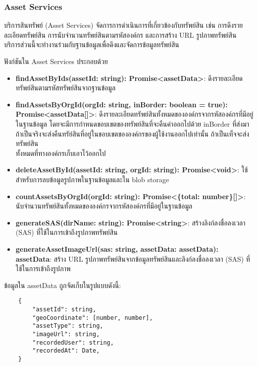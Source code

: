 \subsubsection{Asset Services}
\ifenglish
\else
บริการสินทรัพย์ (Asset Services) จัดการการดำเนินการที่เกี่ยวข้องกับทรัพย์สิน เช่น การดึงรายละเอียดทรัพย์สิน การนับจำนวนทรัพย์สินตามรหัสองค์กร และการสร้าง URL รูปภาพทรัพย์สิน บริการส่วนนี้จะทำงานร่วมกับฐานข้อมูลเพื่อดึงและจัดการข้อมูลทรัพย์สิน

ฟังก์ชันใน Asset Services ประกอบด้วย

\begin{itemize}
    \item \textbf{findAssetByIds(assetId: string): Promise<assetData>}: ดึงรายละเอียดทรัพย์สินตามรหัสทรัพย์สินจากฐานข้อมูล
    \item \textbf{findAssetsByOrgId(orgId: string, inBorder: boolean = true): \\Promise<assetData[]>}: ดึงรายละเอียดทรัพย์สินทั้งหมดขององค์กรจากรหัสองค์กรที่มีอยู่ในฐานข้อมูล โดยจะมีการกำหนดขอบเขตของทรัพย์สินที่จะคืนค่าออกไปด้วย inBorder ที่ส่งมา ถ้าเป็นจริงจะส่งคืนทรัย์สินที่อยู่ในขอบเขตขององค์กรของผู้ใช้งานออกไปเท่านั้น ถ้าเป็นเท็จจะส่งทรัพย์สิน\\ทั้งหมดที่ทางองค์กรเก็บเอาไว้ออกไป
    \item \textbf{deleteAssetById(assetId: string, orgId: string): Promise<void>}: ใช้สำหรับการลบข้อมูลรูปภาพในฐานข้อมูลและใน blob storage
    \item \textbf{countAssetsByOrgId(orgId: string): Promise<\{total: number\}[]>}: นับจำนวนทรัพย์สินทั้งหมดขององค์กรจากรหัสองค์กรที่มีอยู่ในฐานข้อมูล
    \item \textbf{generateSAS(dirName: string): Promise<string>}: สร้างลิงก์ลงชื่อลงเวลา (SAS) ที่ใช้ในการเข้าถึงรูปภาพทรัพย์สิน
    \item \textbf{generateAssetImageUrl(sas: string,
    assetData: assetData): assetData}: สร้าง URL รูปภาพทรัพย์สินจากข้อมูลทรัพย์สินและลิงก์ลงชื่อลงเวลา (SAS) ที่ใช้ในการเข้าถึงรูปภาพ
\end{itemize}

ข้อมูลใน assetData ถูกจัดเก็บในรูปแบบดังนี้:
\begin{lstlisting}
    {
        "assetId": string,
        "geoCoordinate": [number, number],
        "assetType": string,
        "imageUrl": string,
        "recordedUser": string,
        "recordedAt": Date,
    }
\end{lstlisting}
\fi